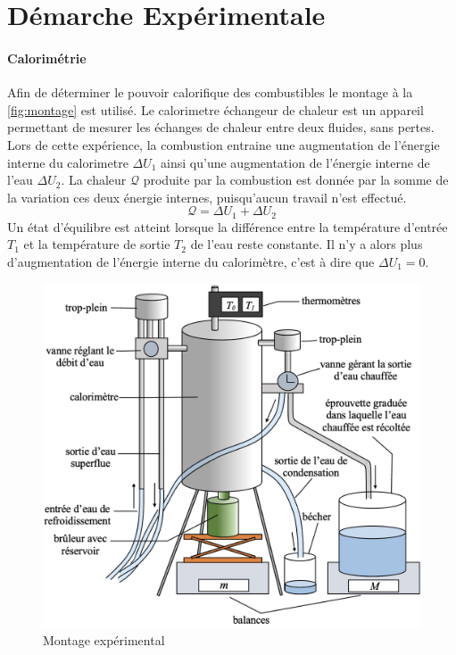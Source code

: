 \section{Démarche Expérimentale}

\paragraph*{Calorimétrie}
Afin de déterminer le pouvoir calorifique des combustibles le montage à la \autoref{fig:montage} est utilisé. Le calorimetre échangeur de chaleur est un appareil permettant de mesurer les échanges de chaleur entre deux fluides, sans pertes. Lors de cette expérience, la combustion entraine une augmentation de l'énergie interne du calorimetre \(\Delta U_1\) ainsi qu'une augmentation de l'énergie interne de l'eau \(\Delta U_2\). La chaleur \(\mathcal{Q}\) produite par la combustion est donnée par la somme de la variation ces deux énergie internes, puisqu'aucun travail n'est effectué.
\begin{equation}
    \mathcal{Q} = \Delta U_1 + \Delta U_2
\end{equation}
Un état d'équilibre est atteint lorsque la différence entre la température d'entrée \(T_1\) et la température de sortie \(T_2\) de l'eau reste constante. Il n'y a alors plus d'augmentation de l'énergie interne du calorimètre, c'est à dire que \(\Delta U_1 = 0\).

\begin{figure}[h]
    \centering
    \includegraphics[width=0.7\linewidth]{figures/montage.png}
    \caption{Montage expérimental \cite{rapport-mendels-pascaud}}
    \label{fig:montage}
\end{figure}


